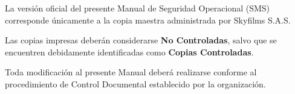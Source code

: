 \vspace{0.2cm}

\begin{tcolorbox}[title=Control de Vigencia,colback=gray!5,colframe=black]

La versión oficial del presente Manual de Seguridad Operacional (SMS) corresponde únicamente a la copia maestra administrada por Skyfilms S.A.S.

Las copias impresas deberán considerarse \textbf{No Controladas}, salvo que se encuentren debidamente identificadas como \textbf{Copias Controladas}.

Toda modificación al presente Manual deberá realizarse conforme al procedimiento de Control Documental establecido por la organización.

\end{tcolorbox}


